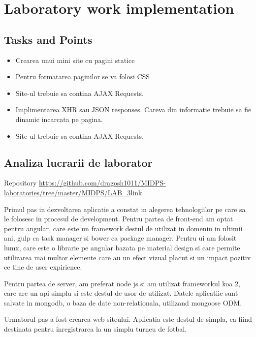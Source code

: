 \section{Laboratory work implementation}

\subsection{Tasks and Points}

\begin{itemize}
	\item Crearea unui mini site cu pagini statice
	\item Pentru formatarea paginilor se va folosi CSS
	\item Site-ul trebuie sa contina AJAX Requests.
	\item Implimentarea XHR sau JSON responses. Careva din informatie trebuie sa fie dinamic incarcata pe pagina.
	\item Site-ul trebuie sa contina AJAX Requests.
\end{itemize}

\subsection{Analiza lucrarii de laborator}

Repository \url{https://github.com/dragosh1011/MIDPS-laboratories/tree/master/MIDPS/LAB_3}{link}

Primul pas in dezvoltarea aplicatie a constat in alegerea tehnologiilor pe care sa le folosesc in procesul de development. 
Pentru partea de front-end am optat pentru angular\cite{angular}, care este un framework destul de utilizat in domeniu in ultimii ani, gulp\cite{gulp} ca task manager si bower\cite{bower} ca package manager. Pentru ui am folosit lumx\cite{lumx}, care este o librarie pe angular bazata pe material design si care permite utilizarea mai multor elemente care au un efect vizual placut si un impact pozitiv ce tine de user expirience. 

Pentru partea de server, am preferat node js\cite{node} si am utilizat frameworkul koa 2\cite{koa}, care are un api simplu si este destul de usor de utilizat. Datele aplicatiie sunt salvate in mongodb\cite{mongodb}, o baza de date non-relationala, utilizand mongoose ODM\cite{mongoose}.

Urmatorul pas a fost crearea web siteului. Aplicatia este destul de simpla, ea fiind destinata pentru inregistrarea la un simplu turneu de fotbal. 

